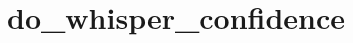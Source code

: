 \label{appendix:do-whisper}
\chapter{do\_whisper\_confidence}

\inputminted{python}{code/do_whisper_confidence}
